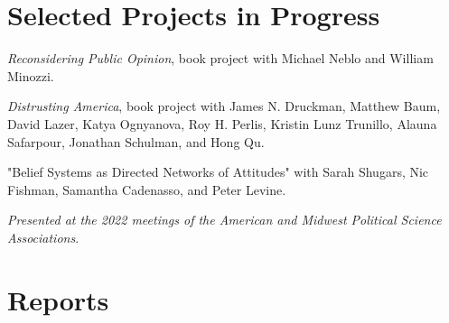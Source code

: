 \documentclass[letterpaper]{article}
\renewenvironment{itemize}{
  \begin{list}{}{
    \setlength{\leftmargin}{1.5em}
  }
}{
  \end{list}
}
\begin{document}
\section*{Selected Projects in Progress}

\begin{itemize}

\item \textit{Reconsidering Public Opinion}, book project with Michael Neblo and William Minozzi.

\item \textit{Distrusting America}, book project with James N. Druckman, Matthew Baum, David Lazer, Katya Ognyanova, Roy H. Perlis, Kristin Lunz Trunillo, Alauna Safarpour, Jonathan Schulman, and Hong Qu.

\item "Belief Systems as Directed Networks of Attitudes" with Sarah Shugars, Nic Fishman, Samantha Cadenasso, and Peter Levine.
\begin{itemize}
\item \textit{Presented at the 2022 meetings of the American and Midwest Political Science Associations}.
\end{itemize} 

\end{itemize}

\section*{Reports}
\end{document}
